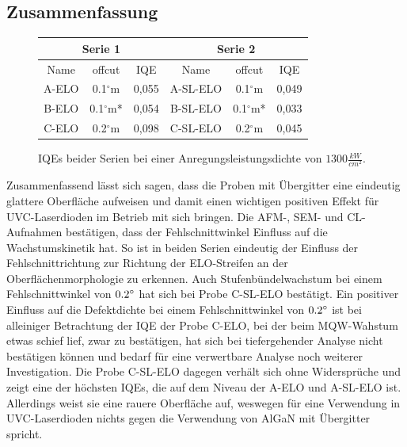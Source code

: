 \subsection{Zusammenfassung}

\begin{figure}[H]
\centering
\begin{tabular}{ |c|c|c|c|c|c|   }
\hline
\multicolumn{3}{|c|}{Serie 1} & \multicolumn{3}{c|}{Serie 2}  \\
\hline
Name & offcut& IQE & Name& offcut & IQE \\
\hline
A-ELO & 0.1$^\circ$m & 0,055 & A-SL-ELO & 0.1$^\circ$m & 0,049  \\
B-ELO & 0.1$^\circ$m*& 0,054& B-SL-ELO & 0.1$^\circ$m* & 0,033 \\
C-ELO & 0.2$^\circ$m & 0,098& C-SL-ELO & 0.2$^\circ$m & 0,045 \\
\hline
\end{tabular}
\caption{IQEs beider Serien bei einer Anregungsleistungsdichte von $ 1300 \frac{kW}{cm^2} $.}
\end{figure}
\noindent 
Zusammenfassend lässt sich sagen, dass die Proben mit Übergitter eine eindeutig glattere Oberfläche aufweisen und damit einen wichtigen positiven Effekt für UVC-Laserdioden im Betrieb mit sich bringen. Die AFM-, SEM- und CL-Aufnahmen bestätigen, dass der Fehlschnittwinkel Einfluss auf die Wachstumskinetik hat. So ist in beiden Serien eindeutig der Einfluss der Fehlschnittrichtung zur Richtung der ELO-Streifen an der Oberflächenmorphologie zu erkennen. Auch Stufenbündelwachstum bei einem Fehlschnittwinkel von $0.2\degree$ hat sich bei Probe C-SL-ELO bestätigt. Ein positiver Einfluss auf die Defektdichte bei einem Fehlschnittwinkel von $0.2 \degree$ ist bei alleiniger Betrachtung der IQE der Probe C-ELO, bei der beim MQW-Wahstum etwas schief lief, zwar zu bestätigen, hat sich bei tiefergehender Analyse nicht bestätigen können und bedarf für eine verwertbare Analyse noch weiterer Investigation. Die Probe C-SL-ELO dagegen verhält sich ohne Widersprüche und zeigt eine der höchsten IQEs, die auf dem Niveau der A-ELO und A-SL-ELO ist. Allerdings weist sie eine rauere Oberfläche auf, weswegen für eine Verwendung in UVC-Laserdioden nichts gegen die Verwendung von AlGaN mit Übergitter spricht. 